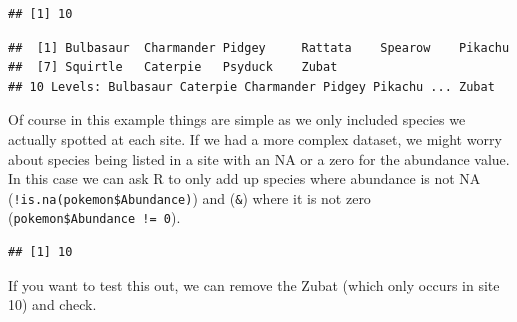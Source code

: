 \documentclass[]{book}
\newenvironment{Shaded}{\begin{snugshade}}{\end{snugshade}}
\newcommand{\KeywordTok}[1]{\textcolor[rgb]{0.13,0.29,0.53}{\textbf{{#1}}}}
\newcommand{\DecValTok}[1]{\textcolor[rgb]{0.00,0.00,0.81}{{#1}}}
\newcommand{\StringTok}[1]{\textcolor[rgb]{0.31,0.60,0.02}{{#1}}}
\newcommand{\CommentTok}[1]{\textcolor[rgb]{0.56,0.35,0.01}{\textit{{#1}}}}
\newcommand{\NormalTok}[1]{{#1}}
\begin{document}
\begin{verbatim}
## [1] 10
\end{verbatim}

\begin{Shaded}
\end{Shaded}

\begin{verbatim}
##  [1] Bulbasaur  Charmander Pidgey     Rattata    Spearow    Pikachu   
##  [7] Squirtle   Caterpie   Psyduck    Zubat     
## 10 Levels: Bulbasaur Caterpie Charmander Pidgey Pikachu ... Zubat
\end{verbatim}

Of course in this example things are simple as we only included species
we actually spotted at each site. If we had a more complex dataset, we
might worry about species being listed in a site with an NA or a zero
for the abundance value. In this case we can ask R to only add up
species where abundance is not NA (\texttt{!is.na(pokemon\$Abundance)})
and (\texttt{\&}) where it is not zero
(\texttt{pokemon\$Abundance\ !=\ 0}).

\begin{Shaded}
\end{Shaded}

\begin{verbatim}
## [1] 10
\end{verbatim}

If you want to test this out, we can remove the Zubat (which only occurs
in site 10) and check.

\begin{Shaded}
\end{Shaded}
\end{document}
